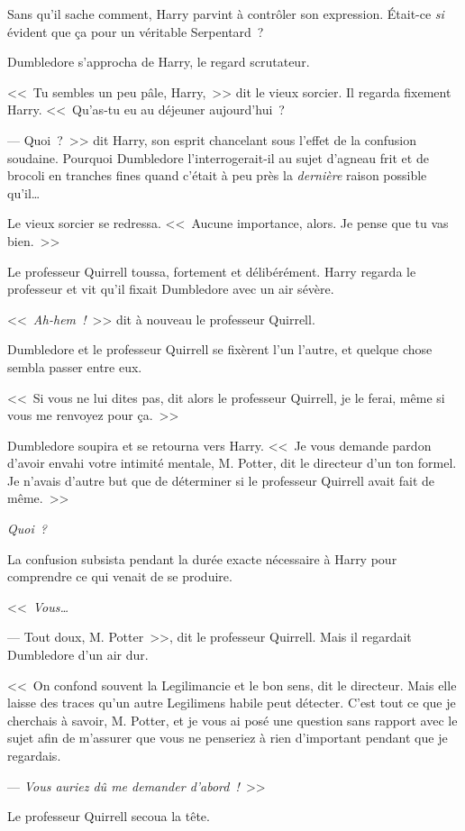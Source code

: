 Sans qu'il sache comment, Harry parvint à contrôler son expression. Était-ce \emph{si} évident que ça pour un véritable Serpentard~?

Dumbledore s'approcha de Harry, le regard scrutateur.

<<~Tu sembles un peu pâle, Harry,~>> dit le vieux sorcier. Il regarda fixement Harry. <<~Qu'as-tu eu au déjeuner aujourd'hui~?

--- Quoi~?~>> dit Harry, son esprit chancelant sous l'effet de la confusion soudaine. Pourquoi Dumbledore l'interrogerait-il au sujet d'agneau frit et de brocoli en tranches fines quand c'était à peu près la \emph{dernière} raison possible qu'il…

Le vieux sorcier se redressa. <<~Aucune importance, alors. Je pense que tu vas bien.~>>

Le professeur Quirrell toussa, fortement et délibérément. Harry regarda le professeur et vit qu'il fixait Dumbledore avec un air sévère.

<<~\emph{Ah-hem~!}~>> dit à nouveau le professeur Quirrell.

Dumbledore et le professeur Quirrell se fixèrent l'un l'autre, et quelque chose sembla passer entre eux.

<<~Si vous ne lui dites pas, dit alors le professeur Quirrell, je le ferai, même si vous me renvoyez pour ça.~>>

Dumbledore soupira et se retourna vers Harry. <<~Je vous demande pardon d'avoir envahi votre intimité mentale, M. Potter, dit le directeur d'un ton formel. Je n'avais d'autre but que de déterminer si le professeur Quirrell avait fait de même.~>>

\emph{Quoi~?}

La confusion subsista pendant la durée exacte nécessaire à Harry pour comprendre ce qui venait de se produire.

<<~\emph{Vous…}

--- Tout doux, M. Potter~>>, dit le professeur Quirrell. Mais il regardait Dumbledore d'un air dur.

<<~On confond souvent la Legilimancie et le bon sens, dit le directeur. Mais elle laisse des traces qu'un autre Legilimens habile peut détecter. C'est tout ce que je cherchais à savoir, M. Potter, et je vous ai posé une question sans rapport avec le sujet afin de m'assurer que vous ne penseriez à rien d'important pendant que je regardais.

--- \emph{Vous auriez dû me demander d'abord~!}~>>

Le professeur Quirrell secoua la tête.


